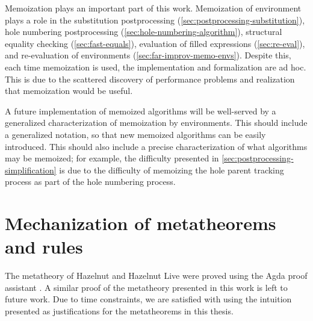 Memoization plays an important part of this work. Memoization of environment plays a role in the substitution postprocessing (\cref{sec:postprocessing-substitution}), hole numbering postprocessing (\cref{sec:hole-numbering-algorithm}), structural equality checking (\cref{sec:fast-equals}), evaluation of filled expressions (\cref{sec:re-eval}), and re-evaluation of environments (\cref{sec:far-improv-memo-envs}). Despite this, each time memoization is used, the implementation and formalization are ad hoc. This is due to the scattered discovery of performance problems and realization that memoization would be useful.

A future implementation of memoized algorithms will be well-served by a generalized characterization of memoization by environments. This should include a generalized notation, so that new memoized algorithms can be easily introduced. This should also include a precise characterization of what algorithms may be memoized; for example, the difficulty presented in \cref{sec:postprocessing-simplification} is due to the difficulty of memoizing the hole parent tracking process as part of the hole numbering process.

\section{Mechanization of metatheorems and rules}
\label{sec:formalization}

The metatheory of Hazelnut and Hazelnut Live were proved using the Agda proof assistant \cite{agda2017_git,agda2019_git}. A similar proof of the metatheory presented in this work is left to future work. Due to time constraints, we are satisfied with using the intuition presented as justifications for the metatheorems in this thesis.

